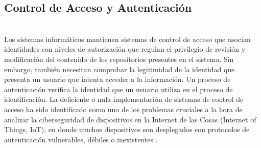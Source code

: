 \subsection{Control de Acceso y Autenticación}
\hfil \\
Los sistemas informáticos mantienen sistemas de control de acceso que
asocian identidades con niveles de autorización que regulan el privilegio de
revisión y modificación del contenido de los repositorios presentes en el
sistema. Sin embargo, también necesitan comprobar la legitimidad de la
identidad que presenta un usuario que intenta acceder a la información. Un
proceso de autenticación verifica la identidad que un usuario utiliza en el
proceso de identificación. 
La deficiente o nula implementación de sistemas de control de acceso ha sido identificado como uno de los problemas
cruciales a la hora de analizar la ciberseguridad de dispositivos en la Internet de las Cosas (Internet of Things, IoT), en donde
muchos dispositivos son desplegados con protocolos de autenticación
vulnerables, débiles o inexistentes \cite{jinUnderstandingIoTSecurity2022}.


